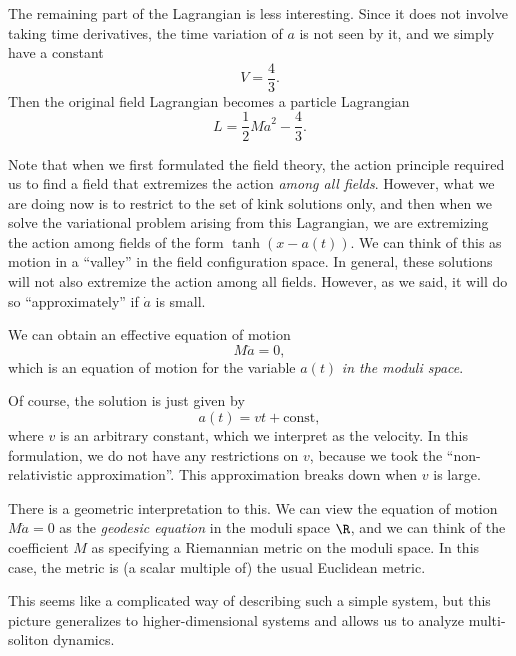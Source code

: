\documentclass[a4paper]{article}
\begin{document}
The remaining part of the Lagrangian is less interesting. Since it does not involve taking time derivatives, the time variation of $a$ is not seen by it, and we simply have a constant
\[
  V = \frac{4}{3}.
\]
Then the original field Lagrangian becomes a particle Lagrangian
\[
  L = \frac{1}{2}M \dot{a}^2 - \frac{4}{3}.
\]

Note that when we first formulated the field theory, the action principle required us to find a field that extremizes the action \emph{among all fields}. However, what we are doing now is to restrict to the set of kink solutions only, and then when we solve the variational problem arising from this Lagrangian, we are extremizing the action among fields of the form $\tanh (x - a(t))$. We can think of this as motion in a ``valley'' in the field configuration space. In general, these solutions will not also extremize the action among all fields. However, as we said, it will do so ``approximately'' if $\dot{a}$ is small.

We can obtain an effective equation of motion
\[
  M \ddot{a} = 0,
\]
which is an equation of motion for the variable $a(t)$ \emph{in the moduli space}.

Of course, the solution is just given by
\[
  a(t) = vt + \mathrm{const},
\]
where $v$ is an arbitrary constant, which we interpret as the velocity. In this formulation, we do not have any restrictions on $v$, because we took the ``non-relativistic approximation''. This approximation breaks down when $v$ is large.

There is a geometric interpretation to this. We can view the equation of motion $M\ddot{a} = 0$ as the \emph{geodesic equation} in the moduli space $\R$, and we can think of the coefficient $M$ as specifying a Riemannian metric on the moduli space. In this case, the metric is (a scalar multiple of) the usual Euclidean metric.

This seems like a complicated way of describing such a simple system, but this picture generalizes to higher-dimensional systems and allows us to analyze multi-soliton dynamics.
\end{document}
